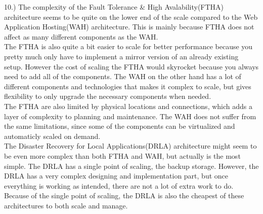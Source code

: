10.) The complexity of the Fault Tolerance \& High Avalability(FTHA) architecture seems to be quite on the lower end of the scale compared to the Web Application Hosting(WAH) architecture. This is mainly because FTHA does not affect as many different components as the WAH. \\
The FTHA is also quite a bit easier to scale for better performance because you pretty much only have to implement a mirror version of an already existing setup. However the cost of scaling the FTHA would skyrocket because you always need to add all of the components. The WAH on the other hand has a lot of different components and technologies that makes it complex to scale, but gives flexibility to only upgrade the necessary components when needed. \\
The FTHA are also limited by physical locations and connections, which adds a layer of complexity to planning and maintenance. The WAH does not suffer from the same limitations, since some of the components can be virtualized and automaticly scaled on demand.\\
The Disaster Recovery for Local Applications(DRLA) architecture might seem to be even more complex than both FTHA and WAH, but actually is the most simple. The DRLA has a single point of scaling, the backup storage. However, the DRLA has a very complex designing and implementation part, but once everything is working as intended, there are not a lot of extra work to do. Because of the single point of scaling, the DRLA is also the cheapest of these architectures to both scale and manage.


